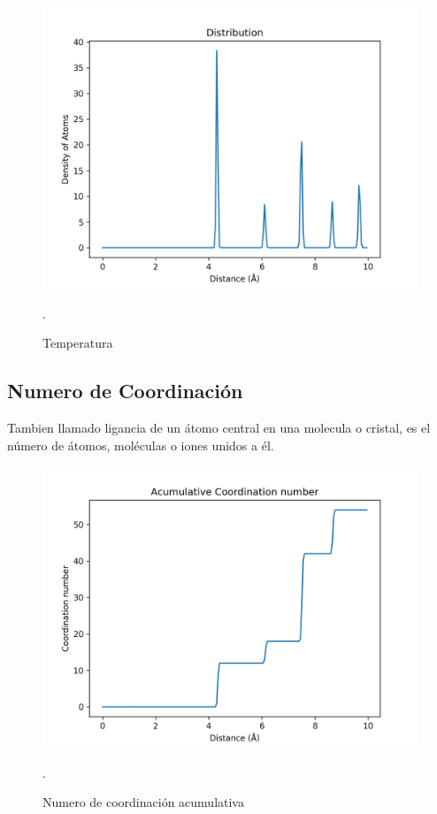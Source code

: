\documentclass[10pt,letterpaper,twocolumn]{article}
\begin{document}
\begin{figure}[h]
	\centering
	\includegraphics[scale=0.50]{distribution (1).png}
	\caption{Temperatura}.
\end{figure}

\subsection*{Numero de Coordinación}

Tambien llamado ligancia de un átomo central en una molecula o cristal, es el número 
de átomos, moléculas o iones unidos a él.

\begin{figure}[h]
	\centering
	\includegraphics[scale=0.50]{coordination number (1).png}
	\caption{Numero de coordinación acumulativa}.
\end{figure}
\end{document}
